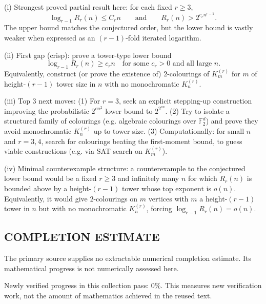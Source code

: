 (i) Strongest proved partial result here: for each fixed $r\ge 3$,
\[
\log_{r-1} R_r(n) \le C_r n \qquad\text{and}\qquad R_r(n) > 2^{c_r n^{r-1}}.
\]
The upper bound matches the conjectured order, but the lower bound is vastly weaker when expressed as an $(r-1)$-fold iterated logarithm.

(ii) First gap (crisp): prove a tower-type lower bound
\[
\log_{r-1} R_r(n) \ge c_r n\quad\text{for some }c_r>0 \text{ and all large }n.
\]
Equivalently, construct (or prove the existence of) $2$-colourings of $K_m^{(r)}$ for $m$ of height-$(r-1)$ tower size in $n$ with no monochromatic $K_n^{(r)}$.

(iii) Top 3 next moves:
(1) For $r=3$, seek an explicit stepping-up construction improving the probabilistic $2^{c n^2}$ lower bound to $2^{2^{c n}}$.
(2) Try to isolate a structured family of colourings (e.g. algebraic colourings over $\mathbb{F}_2^d$) and prove they avoid monochromatic $K_n^{(r)}$ up to tower size.
(3) Computationally: for small $n$ and $r=3,4$, search for colourings beating the first-moment bound, to guess viable constructions (e.g. via SAT search on $K_m^{(r)}$).

(iv) Minimal counterexample structure: a counterexample to the conjectured lower bound would be a fixed $r\ge 3$ and infinitely many $n$ for which
$R_r(n)$ is bounded above by a height-$(r-1)$ tower whose top exponent is $o(n)$.
Equivalently, it would give $2$-colourings on $m$ vertices with $m$ a height-$(r-1)$ tower in $n$ but with no monochromatic $K_n^{(r)}$, forcing $\log_{r-1} R_r(n)=o(n)$.




\subsection*{COMPLETION ESTIMATE}
The primary source supplies no extractable numerical completion estimate. Its mathematical progress is not numerically assessed here.

Newly verified progress in this collection pass: $0\%$. This measures new verification work, not the amount of mathematics achieved in the reused text.
